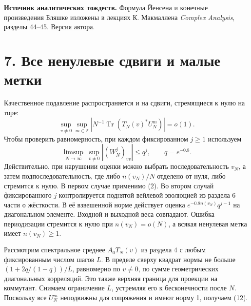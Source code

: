 \documentclass[11pt,a4paper]{article}
\newcommand{\Tr}{\operatorname{Tr}}
\newcommand{\Z}{\mathbb Z}
\newcommand{\sect}[1]{\section*{\sffamily\color{ink}#1}}
\begin{document}
\textbf{Источник аналитических тождеств.} Формула Йенсена и конечные произведения Бляшке изложены в лекциях К. Макмаллена \emph{Complex Analysis}, разделы 44--45. \href{https://people.math.harvard.edu/~ctm/home/text/class/berkeley/205/93/course/course.pdf}{Версия автора}.
\newpage
\sect{7. Все ненулевые сдвиги и малые метки}
Качественное подавление распространяется и на сдвиги, стремящиеся к нулю на торе:
\[
                \sup_{v\ne0}\sup_{m\in\Z}
                   |N^{-1}\Tr(T_N(v)^* U_N^m)|=o(1).               \tag{12}
\]
Чтобы проверить равномерность, при каждом фиксированном $j\ge1$ используем
\[
 \limsup_{N\to\infty}\ \sup_{v\ne0}|(W_N^j)_{vv}|\le q^j,
                   \qquad q=e^{-0.8}.
\]
Действительно, при нарушении оценки можно выбрать последовательность $v_N$, а затем подпоследовательность, где либо $n(v_N)/N$ отделено от нуля, либо стремится к нулю. В первом случае применимо (2). Во втором случай фиксированного $j$ контролируется поднятой вейлевой эволюцией из раздела 6 части о жёсткости. В её взвешенной норме действует оценка $e^{-0.8 n(v_N)}q^{j-1}$ на диагональном элементе. Входной и выходной веса совпадают. Ошибка периодизации стремится к нулю при $n(v_N)=o(N)$, а всякая ненулевая метка имеет $n(v_N)\ge1$.

Рассмотрим спектральное среднее $A_0 T_N(v)$ из раздела 4 с любым фиксированным числом шагов $L$. В пределе сверху квадрат нормы не больше $(1+2q/(1-q))/L$, равномерно по $v\ne0$, по сумме геометрических диагональных корреляций. Это также верхняя граница для проекции на коммутант. Снимаем ограничение $L$, устремляя его к бесконечности после $N$. Поскольку все $U_N^m$ неподвижны для сопряжения и имеют норму 1, получаем (12).
\end{document}
